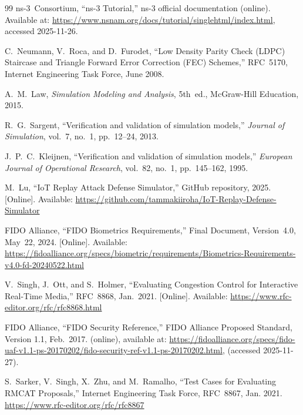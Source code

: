 \documentclass[twocolumn,10pt,a4paper]{jsarticle}
\begin{document}
\begin{thebibliography}{99}
ns-3~Consortium,
``ns-3 Tutorial,''
ns-3 official documentation (online).
Available at: \url{https://www.nsnam.org/docs/tutorial/singlehtml/index.html},
accessed 2025-11-26.

C.~Neumann, V.~Roca, and D.~Furodet,
``Low Density Parity Check (LDPC) Staircase and Triangle Forward Error Correction (FEC) Schemes,''
RFC~5170, Internet Engineering Task Force, June 2008.

A.~M.~Law,
\textit{Simulation Modeling and Analysis}, 5th~ed.,
McGraw-Hill Education, 2015.

R.~G.~Sargent,
``Verification and validation of simulation models,''
\textit{Journal of Simulation}, vol.~7, no.~1, pp.~12--24, 2013.

J.~P.~C.~Kleijnen,
``Verification and validation of simulation models,''
\textit{European Journal of Operational Research}, vol.~82, no.~1, pp.~145--162, 1995.

M.~Lu,
``IoT Replay Attack Defense Simulator,''
GitHub repository, 2025.
[Online]. Available:
\url{https://github.com/tammakiiroha/IoT-Replay-Defense-Simulator}

FIDO Alliance,
``FIDO Biometrics Requirements,''
Final Document, Version~4.0, May~22, 2024.
[Online]. Available:
\url{https://fidoalliance.org/specs/biometric/requirements/Biometrics-Requirements-v4.0-fd-20240522.html}

V.~Singh, J.~Ott, and S.~Holmer,
``Evaluating Congestion Control for Interactive Real-Time Media,''
RFC~8868, Jan.~2021.
[Online]. Available: \url{https://www.rfc-editor.org/rfc/rfc8868.html}

FIDO Alliance,
``FIDO Security Reference,''
FIDO Alliance Proposed Standard, Version 1.1, Feb.\ 2017.
(online), available at: \url{https://fidoalliance.org/specs/fido-uaf-v1.1-ps-20170202/fido-security-ref-v1.1-ps-20170202.html},
(accessed 2025-11-27).

S.~Sarker, V.~Singh, X.~Zhu, and M.~Ramalho,
``Test Cases for Evaluating RMCAT Proposals,''
Internet Engineering Task Force, RFC~8867, Jan. 2021.
\url{https://www.rfc-editor.org/rfc/rfc8867}

\end{thebibliography}
\end{document}
